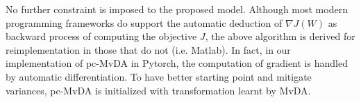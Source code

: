         No further constraint is imposed to the proposed model. Although most modern programming frameworks do support the automatic deduction of $\nabla J\left(W\right)$ as backward process of computing the objective $J$, the above algorithm is derived for reimplementation in those that do not (i.e. Matlab).
        In fact, in our implementation of pc-MvDA in Pytorch, the computation of gradient is handled by automatic differentiation.
        To have better starting point and mitigate variances, pc-MvDA is initialized with transformation learnt by MvDA.

